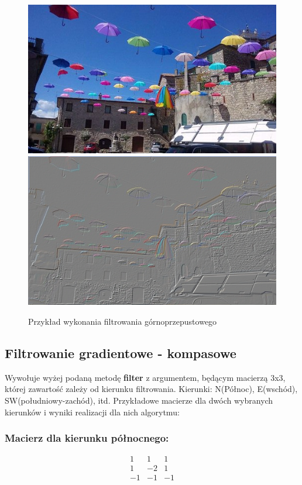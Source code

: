 \documentclass{article}
\begin{document}
\begin{figure}[!ht]
	\includegraphics[scale=1.2]{img/rgb-obraz1}
	\includegraphics[scale=1.2]{img/filtrowanie/rgb-gornoprzepustowe-robertsa}
	\caption{Przykład wykonania filtrowania górnoprzepustowego}
	\label{fig22}	
	\end{figure}	
	
	
	\subsection{Filtrowanie gradientowe - kompasowe}
	Wywołuje wyżej podaną metodę \textbf{filter} z argumentem, będącym macierzą 3x3, której zawartość zależy od kierunku filtrowania. Kierunki: N(Północ), E(wschód), SW(południowy-zachód), itd.
	Przykładowe macierze dla dwóch wybranych kierunków i wyniki realizacji dla nich algorytmu:
	\subsubsection{Macierz dla kierunku północnego:}
	\begin{equation*}
	\begin{matrix}
	1 & 1 & 1 \\
	1 & -2 & 1 \\
	-1 & -1 & -1
	\end{matrix}
	\end{equation*}
		
\end{document}
